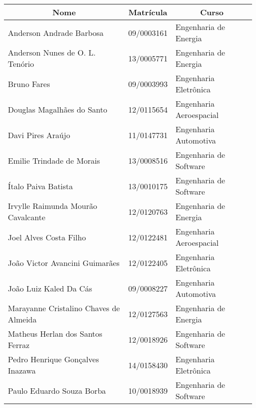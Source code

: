 \begin{resumo}[Autores]

\begin{table}[!h]
\centering
\label{my-label}
\begin{tabular}{|l|l|l|}
\hline
\multicolumn{1}{|c|}{\textbf{Nome}}    & \multicolumn{1}{c|}{\textbf{Matrícula}} & \multicolumn{1}{c|}{\textbf{Curso}} \\ \hline
Anderson Andrade Barbosa        & 09/0003161                              & Engenharia de Energia               \\ \hline
Anderson Nunes de O. L. Tenório               & 13/0005771                             & Engenharia de Energia               \\ \hline
Bruno Fares                            & 09/0003993                              & Engenharia Eletrônica               \\ \hline
Douglas Magalhães do Santo             & 12/0115654                              & Engenharia Aeroespacial             \\ \hline
Davi Pires Araújo                      & 11/0147731                              & Engenharia Automotiva               \\ \hline
Emilie Trindade de Morais              & 13/0008516                              & Engenharia de Software              \\ \hline
Ítalo Paiva Batista                    & 13/0010175                              & Engenharia de Software              \\ \hline
Irvylle Raimunda Mourão Cavalcante     & 12/0120763                              & Engenharia de Energia               \\ \hline
Joel Alves Costa Filho                 & 12/0122481                              & Engenharia Aeroespacial             \\ \hline
João Victor Avancini Guimarães         & 12/0122405                              & Engenharia Eletrônica               \\ \hline
João Luiz Kaled Da Cás                 & 09/0008227                              & Engenharia Automotiva               \\ \hline
Marayanne Cristalino Chaves de Almeida & 12/0127563                              & Engenharia de Energia               \\ \hline
Matheus Herlan dos Santos Ferraz       & 12/0018926                              & Engenharia de Software              \\ \hline
Pedro Henrique Gonçalves Inazawa       & 14/0158430                              & Engenharia Eletrônica               \\ \hline
Paulo Eduardo Souza Borba              & 10/0018939                              & Engenharia de Software              \\ \hline
\end{tabular}
\end{table}

\end{resumo}
\pagebreak


